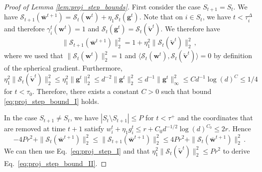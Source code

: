 \documentclass[11pt]{article}
\newcommand{\<}{\langle}
\renewcommand{\>}{\rangle}
\theoremstyle{definition}
\def\bg{{\boldsymbol g}}
\def\bv{{\boldsymbol v}}
\def\bw{{\boldsymbol w}}
\def\cS{{\mathcal S}}
\def\bg{{\boldsymbol g}}
\def\bv{{\boldsymbol v}}
\def\bw{{\boldsymbol w}}
\def\bg{{\boldsymbol g}}
\def\cS{{\mathcal S}}
\def\bg{{\boldsymbol g}}
\def\obw{\overline{\bw}}
\def\tbv{\widetilde{\bv}}
\begin{document}
\begin{proof}[Proof of Lemma \ref{lem:proj_step_bounds}]
First consider the case $S_{t+1} = S_t$. We have $\cS_{t+1} ( \obw^{t+1} ) = \cS_t ( \bw^t) + \eta_1 \cS_t ( \bg^t)$. Note that on $i \in S_t$, we have $t < \tau_i^{\Delta}$ and therefore $\gamma_i^t ( \bw^t) = 1$ and $\cS_t ( \bg^t) = \cS_t ( \tbv^t)$. We therefore have
\begin{equation}\label{eq:proj_step_I}
\| \cS_{t+1} (\obw^{t+1} ) \|_2^2 = 1 + \eta_1^2 \| \cS_t ( \tbv^t) \|_2^2 \, ,
\end{equation}
where we used that $\| \cS_t ( \bw^t)\|_2^2 = 1$ and $\<\cS_t ( \bw^t), \cS_t ( \tbv^t) \> = 0$ by definition of the spherical gradient.
Furthermore, $\eta_1^2 \| \cS_t ( \tbv^t ) \|_2^2 \leq \eta_1^2 \| \bg^t \|_2^2 \leq d^{-2} \|\bg^t\|_2^2 \leq d^{-1} \| \bg^t \|_\infty^2 \leq C d^{-1} \log(d)^C \leq 1/4$ for $t < \tau_0$. Therefore, there exists a constant $C >0$ such that bound \eqref{eq:proj_step_bound_I} holds.

In the case $S_{t+1} \neq S_t$, we have $|S_{t} \setminus S_{t+1}| \leq P$ for $t < \tau^+$ and the coordinates that are removed at time $t+1$ satisfy $w_i^t + \eta_1 g_i^t \leq r + C_0 d^{-1/2} \log(d)^{C_0} \leq 2r$. Hence
\[
- 4 Pr^2  + \| \cS_{t} (\obw^{t+1} ) \|_2^2 \leq \| \cS_{t+1} (\obw^{t+1} ) \|_2^2 \leq  4 Pr^2  + \| \cS_{t} (\obw^{t+1} ) \|_2^2 \, .
\]
We can then use Eq.~\eqref{eq:proj_step_I} and that $\eta_1^2 \| \cS_t ( \tbv^t) \|_2^2 \leq Pr^2$ to derive Eq.~\eqref{eq:proj_step_bound_II}.
\end{proof}
\end{document}
